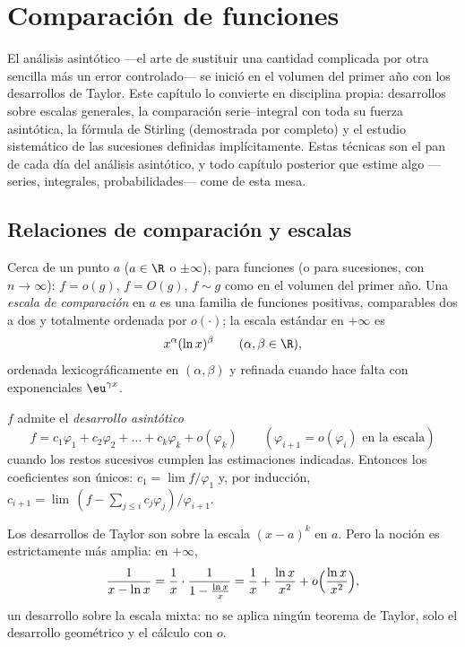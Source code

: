 \chapter{Comparación de funciones}\label{ch:b2:comparison}

El análisis asintótico ---el arte de sustituir una cantidad
complicada por otra sencilla más un error controlado--- se inició en
el volumen del primer año con los desarrollos de Taylor. Este capítulo
lo convierte en disciplina propia: desarrollos sobre escalas
generales, la comparación serie--integral con toda su fuerza
asintótica, la fórmula de Stirling (demostrada por completo) y el
estudio sistemático de las sucesiones definidas implícitamente. Estas
técnicas son el pan de cada día del análisis asintótico, y todo
capítulo posterior que estime algo ---series, integrales,
probabilidades--- come de esta mesa.

\section{Relaciones de comparación y escalas}

\begin{definition}\label{def:b2:comparison:landau}
Cerca de un punto $a$ ($a \in \R$ o $\pm\infty$), para funciones (o
para sucesiones, con $n \to \infty$): $f = o(g)$, $f = O(g)$, $f
\sim g$ como en el volumen del primer año. Una \emph{escala de
comparación} en $a$ es una familia de
funciones positivas, comparables dos a dos y totalmente ordenada por
$o(\cdot)$; la escala estándar en $+\infty$ es
\[
x^{\alpha} (\ln x)^{\beta}
\qquad (\alpha, \beta \in \R),
\]
ordenada lexicográficamente en $(\alpha, \beta)$ y refinada cuando
hace falta con exponenciales $\eu^{\gamma x}$.
\end{definition}

\begin{definition}\label{def:b2:comparison:expansion}
$f$ admite el \emph{desarrollo asintótico}
\[
f = c_1 \varphi_1 + c_2\varphi_2 + \dots + c_k \varphi_k +
o(\varphi_k)
\qquad (\varphi_{i+1} = o(\varphi_i) \text{ en la escala})
\]
cuando los restos sucesivos cumplen las estimaciones indicadas.
Entonces los coeficientes son únicos: $c_1 = \lim f/\varphi_1$ y,
por inducción, $c_{i+1} = \lim\,(f - \sum_{j \leq i}
c_j\varphi_j)/\varphi_{i+1}$.
\end{definition}

\begin{example}
Los desarrollos de Taylor son  sobre la
escala $(x - a)^k$ en $a$. Pero la noción es estrictamente más
amplia: en $+\infty$,
\[
\frac{1}{x - \ln x}
= \frac1x \cdot \frac{1}{1 - \frac{\ln x}{x}}
= \frac1x + \frac{\ln x}{x^2} + o\Bigl(\frac{\ln x}{x^2}\Bigr),
\]
un desarrollo sobre la escala mixta: no se aplica ningún teorema de
Taylor, solo el desarrollo geométrico y el cálculo con $o$.
\end{example}


